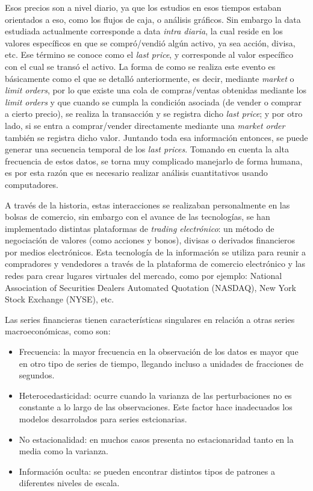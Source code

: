 Esos precios son a nivel diario, ya que los estudios en esos tiempos estaban orientados a eso, como los flujos de caja, o análisis gráficos.
Sin embargo la data estudiada actualmente corresponde a data \emph{intra diaria}, la cual reside en los valores
específicos en que se compró/vendió algún activo, ya sea acción, divisa, etc. Ese término se conoce como el \emph{last price}, y corresponde
al valor específico con el cual se transó el activo. La forma de como se realiza este evento es básicamente como el que se detalló anteriormente,
es decir, mediante \emph{market} o \emph{limit orders}, por lo que existe una cola de compras/ventas obtenidas mediante los \emph{limit orders} y que cuando
se cumpla la condición asociada (de vender o comprar a cierto precio), se realiza la transacción y se registra dicho \emph{last price}; 
y por otro lado, si se entra a comprar/vender directamente mediante una \emph{market order} también se registra dicho valor. 
Juntando toda esa información entonces, se puede generar una secuencia temporal de los \emph{last prices}. Tomando en cuenta la alta frecuencia de estos datos,
se torna muy complicado manejarlo de forma humana, es por esta razón que es necesario realizar análisis cuantitativos usando computadores.

A través de la historia, estas interacciones se realizaban personalmente en las bolsas de comercio, sin embargo con el avance de las tecnologías,
se han implementado distintas plataformas de \emph{trading electrónico}: un método de negociación de valores (como acciones y bonos), divisas o derivados 
financieros por medios electrónicos. Esta tecnología de la información se utiliza para reunir a compradores y vendedores a través de la plataforma de 
comercio electrónico y las redes para crear lugares virtuales del mercado, como por ejemplo: National Association of Securities Dealers Automated 
Quotation (NASDAQ), New York Stock Exchange (NYSE), etc.

Las series financieras tienen características singulares en relación a otras series macroeconómicas, como son: 
\begin{itemize}
	\item Frecuencia: la mayor frecuencia en la observación de los datos es mayor que en otro tipo de series de tiempo, llegando incluso
		a unidades de fracciones de segundos.
	\item Heterocedasticidad: ocurre cuando la varianza de las perturbaciones no es constante a lo largo de las observaciones.
		Este factor hace inadecuados los modelos desarrolados para series estcionarias.
	\item No estacionalidad: en muchos casos presenta no estacionaridad tanto en la media como la varianza.
	\item Información oculta: se pueden encontrar distintos tipos de patrones a diferentes niveles de escala.
\end{itemize}

